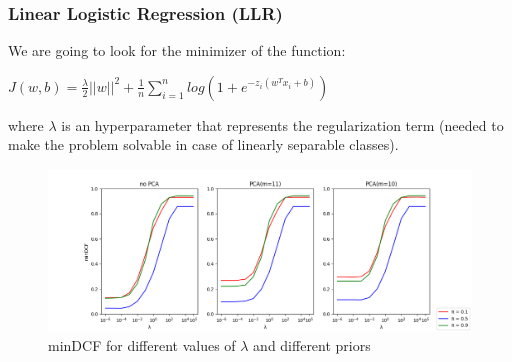 \documentclass[10pt, a4paper, twocolumn]{article} %
\begin{document}
\subsubsection{Linear Logistic Regression (LLR)}
We are going to look for the minimizer of the function:
\begin{center}
	\begin{math}
		J(w,b) = \frac{\lambda}{2}||w||^2 + \frac{1}{n}\sum_{i=1}^{n}log(1 + e^{-z_i(w^Tx_i+b)})
	\end{math}
\end{center}
where $\lambda$ is an hyperparameter that represents the regularization term (needed to make the 
problem solvable in case of linearly separable classes).
\begin{figure}[ht!]
	\includegraphics[width=\linewidth]{./Pictures/FeaturesAnalysis/dcfplotLLR.png}
	\caption{minDCF for different values of $\lambda$ and different priors}
	\label{dcfLLR} 
\end{figure}
\end{document}
